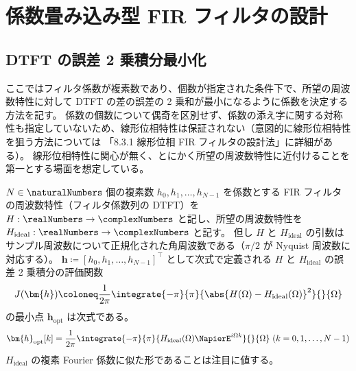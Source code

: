 \section{係数畳み込み型 FIR フィルタの設計}
    \subsection{DTFT の誤差 2 乗積分最小化}
        \newcommand{\Hideal}{H_\text{ideal}}
        \newcommand{\vhOpt}{\bm{h}_\text{opt}}
        ここではフィルタ係数が複素数であり、個数が指定された条件下で、所望の周波数特性に対して DTFT の差の誤差の 2 乗和が最小になるように係数を決定する方法を記す。
        係数の個数について偶奇を区別せず、係数の添え字に関する対称性も指定していないため、線形位相特性は保証されない（意図的に線形位相特性を狙う方法については \cite{learn_sp_from_basic} 「8.3.1 線形位相 FIR フィルタの設計法」に詳細がある）。
        線形位相特性に関心が無く、とにかく所望の周波数特性に近付けることを第一とする場面を想定している。
        \begin{shadebox}
            $N\in\naturalNumbers$ 個の複素数 $h_0,h_1,\dots,h_{N-1}$ を係数とする FIR フィルタの周波数特性（フィルタ係数列の DTFT）を $H:\realNumbers\to\complexNumbers$ と記し、所望の周波数特性を $\Hideal:\realNumbers\to\complexNumbers$ と記す。
            但し $H$ と $\Hideal$ の引数はサンプル周波数について正規化された角周波数である（$\pi/2$ が Nyquist 周波数に対応する）。
            $\bm{h}\coloneqq[h_0,h_1,\dots,h_{N-1}]^\top$ として次式で定義される $H$ と $\Hideal$ の誤差 2 乗積分の評価関数
            \[ J(\bm{h}) \coloneq \frac{1}{2\pi}\integrate{-\pi}{\pi}{\abs{H(\Omega)-\Hideal(\Omega)}^2}{}{\Omega} \]
            の最小点 $\vhOpt$ は次式である。
            \[ \vhOpt[k] = \frac{1}{2\pi}\integrate{-\pi}{\pi}{\Hideal(\Omega)\NapierE^{i\Omega k}}{}{\Omega}\;(k=0,1,\dots,N-1) \]
            $\Hideal$ の複素 Fourier 係数に似た形であることは注目に値する。
        \end{shadebox}
